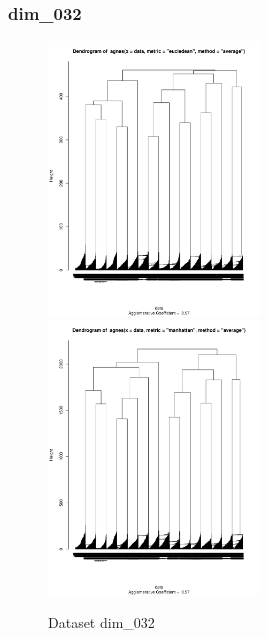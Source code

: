 \documentclass[xcolor={usenames,dvipsnames}, 
	hyperref={
	colorlinks=true, 						%
	linkcolor=black, 						%
	urlcolor=black,							%
	citecolor=black,						%
	pdfpagelabels=false,
	},
	ignorenonframetext,			%
	compress					%
]{beamer}
\begin{document}
\begin{frame}
   \frametitle{dim\_032}
\begin{figure}[ht!]
\caption{Dataset dim\_032}
\centering
\includegraphics[width=0.5\textwidth]{plots/dim032/eucledean_dim032.pdf}
\hfill  \hfill
\includegraphics[width = 0.5\textwidth]{plots/dim032/manhattan_dim032.pdf}
\end{figure}
\end{frame}
\end{document}
